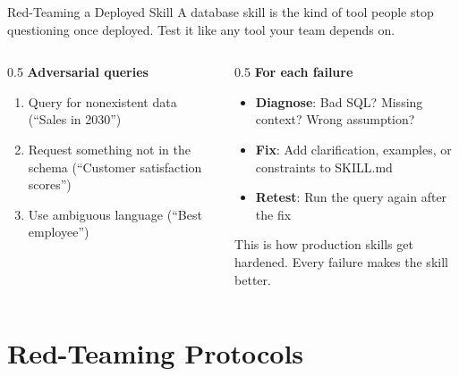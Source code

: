 \documentclass[aspectratio=169]{beamer}
\begin{document}
\begin{frame}{Red-Teaming a Deployed Skill}
A database skill is the kind of tool people \alert{stop questioning} once deployed. Test it like any tool your team depends on.
\vspace{0.3cm}
\begin{columns}[T]
\begin{column}{0.5\textwidth}
\textbf{Adversarial queries}
\begin{enumerate}\small
  \item Query for nonexistent data (``Sales in 2030'')
  \item Request something not in the schema (``Customer satisfaction scores'')
  \item Use ambiguous language (``Best employee'')
\end{enumerate}
\end{column}
\begin{column}{0.5\textwidth}
\textbf{For each failure}
\begin{itemize}\small
  \item \textbf{Diagnose}: Bad SQL? Missing context? Wrong assumption?
  \item \textbf{Fix}: Add clarification, examples, or constraints to SKILL.md
  \item \textbf{Retest}: Run the query again after the fix
\end{itemize}
\vspace{0.3cm}
This is how production skills get hardened. \alert{Every failure makes the skill better.}
\end{column}
\end{columns}
\end{frame}

\section{Red-Teaming Protocols}
\end{document}

